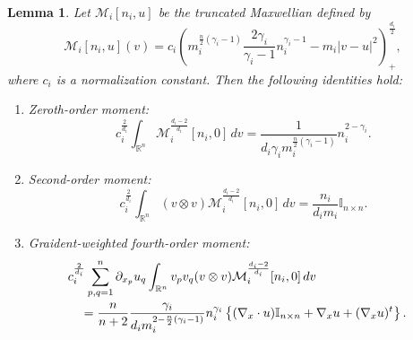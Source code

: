 \documentclass[10pt,reqno]{amsart}
\numberwithin{equation}{section}
\newtheorem{lemma}{Lemma}[section]
\newcommand{\R}{\mathbb R}
\newcommand{\pa}{\partial}
\begin{document}
\begin{lemma}\label{lem_vm} Let $\mathcal{M}_i[n_i, u]$ be the truncated Maxwellian defined by
\[
\mathcal{M}_i[n_i,u](v) = c_i \left( m_i^{\frac{n}{2}(\gamma_i-1)} \frac{2\gamma_i}{\gamma_i-1} n_i^{\gamma_i - 1} - m_i |v-u|^2 \right)_+^{\frac{d_i}{2}},
\]
where $c_i$ is a normalization constant. Then the following identities hold:
\begin{enumerate}
\item[(i)] Zeroth-order moment:
\[
c_i^{\frac{2}{d_i}}\int_{\R^n} \mathcal{M}_i^{\frac{d_i - 2}{d_i}}[n_i, 0]  \,dv = \frac{1}{d_i \gamma_i m_i^{\frac{n}{2}(\gamma_i - 1)}} n_i^{2 - \gamma_i}.
\]
\item[(ii)] Second-order moment:
\[
c_i^{\frac{2}{d_i}}\int_{\R^n} (v  \otimes v) \mathcal{M}_i^{\frac{d_i - 2}{d_i}}[n_i, 0] \,dv = \frac{n_i}{d_i m_i} \mathbb{I}_{n \times n}.
\]
\item[(iii)] Graident-weighted fourth-order moment:
\begin{align*}
&c_i^{\frac{2}{d_i}} \sum_{p,q=1}^n \pa_{x_p} u_q \int_{\R^n} v_p  v_q  (v \otimes v) \mathcal{M}_i^{\frac{d_i - 2}{d_i}}[n_i, 0]  \, dv \cr
&\quad = \frac{n}{n+2}\frac{\gamma_i}{d_i m_i^{2 - \frac n2(\gamma_i-1)}}n_i^{\gamma_i}\left\{(\nabla_x\cdot u) \mathbb{I}_{n\times n} +\nabla_x u+(\nabla_xu)^t \right\}.
\end{align*}
\end{enumerate}
\end{lemma}

 

\end{document}
